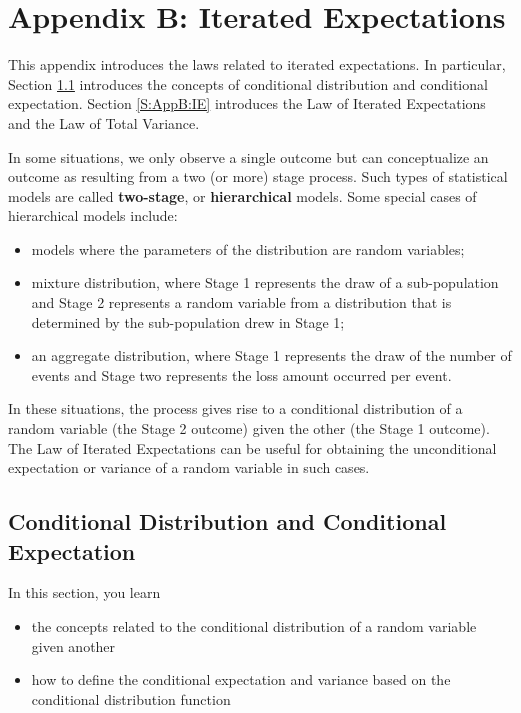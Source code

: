 \documentclass[]{book}
\providecommand{\tightlist}{%
  \setlength{\itemsep}{0pt}\setlength{\parskip}{0pt}}
\theoremstyle{definition}
\theoremstyle{definition}
\theoremstyle{definition}
\theoremstyle{remark}
\begin{document}
\chapter{Appendix B: Iterated Expectations}\label{C:AppB}

This appendix introduces the laws related to iterated expectations. In
particular, Section \ref{S:AppB:CD} introduces the concepts of
conditional distribution and conditional expectation. Section
\ref{S:AppB:IE} introduces the Law of Iterated Expectations and the Law
of Total Variance.

In some situations, we only observe a single outcome but can
conceptualize an outcome as resulting from a two (or more) stage
process. Such types of statistical models are called \textbf{two-stage},
or \textbf{hierarchical} models. Some special cases of hierarchical
models include:

\begin{itemize}
\item
  models where the parameters of the distribution are random variables;
\item
  mixture distribution, where Stage 1 represents the draw of a
  sub-population and Stage 2 represents a random variable from a
  distribution that is determined by the sub-population drew in Stage 1;
\item
  an aggregate distribution, where Stage 1 represents the draw of the
  number of events and Stage two represents the loss amount occurred per
  event.
\end{itemize}

In these situations, the process gives rise to a conditional
distribution of a random variable (the Stage 2 outcome) given the other
(the Stage 1 outcome). The Law of Iterated Expectations can be useful
for obtaining the unconditional expectation or variance of a random
variable in such cases.

\section{Conditional Distribution and Conditional
Expectation}\label{S:AppB:CD}

In this section, you learn

\begin{itemize}
\tightlist
\item
  the concepts related to the conditional distribution of a random
  variable given another
\item
  how to define the conditional expectation and variance based on the
  conditional distribution function
\end{itemize}
\end{document}
